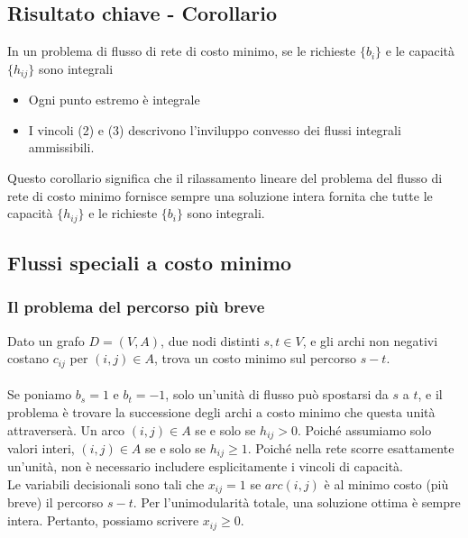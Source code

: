 \documentclass[12pt,a4paper]{article}
\begin{document}
\subsection{Risultato chiave - Corollario}
In un problema di flusso di rete di costo minimo, se le richieste $\{b_i\}$ e le capacità $\{h_{ij}\}$ sono integrali
\begin{itemize}
\item Ogni punto estremo è integrale
\item I vincoli (2) e (3) descrivono l'inviluppo convesso dei flussi integrali ammissibili.
\end{itemize}

\SmallSep\noindent
Questo corollario significa che il rilassamento lineare del problema del flusso di rete di costo minimo fornisce sempre una soluzione intera fornita che tutte le capacità $\{h_{ij}\}$ e le richieste $\{b_i\}$ sono integrali.

\subsection{Flussi speciali a costo minimo}
\subsubsection{Il problema del percorso più breve}
Dato un grafo $D = (V,A)$, due nodi distinti $s, t \in V$, e gli archi non negativi costano $c_{ij}$ per $(i, j) \in A$, trova un costo minimo sul percorso $s-t$.\\
\\
Se poniamo $b_s = 1$ e $b_t = -1$, solo un'unità di flusso può spostarsi da $s$ a $t$, e il problema è trovare la successione degli archi a costo minimo che questa unità attraverserà. Un arco $(i, j) \in A$ se e solo se $h_{ij} > 0$. Poiché assumiamo solo valori interi, $(i, j) \in A$ se e solo se $h_{ij} \geq 1$. Poiché nella rete scorre esattamente un'unità, non è necessario
includere esplicitamente i vincoli di capacità.\\
Le variabili decisionali sono tali che $x_{ij} = 1$ se $arc(i, j)$ è al minimo costo (più breve) il percorso $s-t$. Per l'unimodularità totale, una soluzione ottima è sempre intera. Pertanto, possiamo scrivere $x_{ij} \geq 0$.
\end{document}
